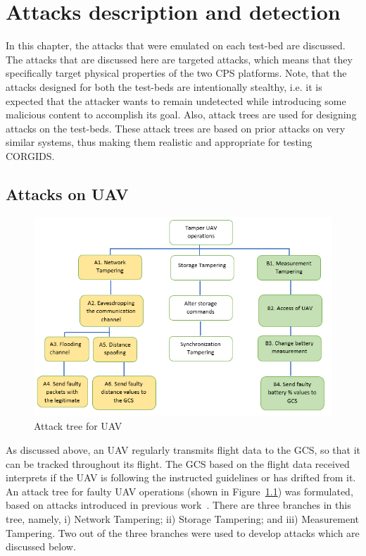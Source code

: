 
\chapter{\textbf{Attacks description and detection}}
\label{ch:Attacks}

In this chapter, the attacks that were emulated on each test-bed are discussed. The attacks that are discussed here are  targeted attacks, which means that they specifically target physical properties of the two CPS platforms. Note, that the attacks designed for both the test-beds are intentionally stealthy, i.e. it is expected that the attacker wants to remain undetected while introducing some malicious content to accomplish its goal. Also, attack trees are used for designing attacks on the test-beds. These attack trees are based on prior attacks on very similar systems, thus making them realistic and appropriate for testing CORGIDS.


\section{Attacks on UAV}

\begin{figure}[ht]
    \centering
    \includegraphics[scale=0.55,keepaspectratio = true]{Graphics/AttackTreeUAVNew.png}
    \caption{Attack tree for UAV}
    \label{fig:attackTreeUAV}
\end{figure}
As discussed above, an UAV regularly transmits flight data to the GCS, so that it can be tracked throughout its flight. The GCS based on the flight data received interprets if the UAV is following the instructed guidelines or has drifted from it. An attack tree for faulty UAV operations (shown in Figure~\ref{fig:attackTreeUAV}) was formulated, based on attacks introduced in previous work~\cite{javaid2012cyber, mitchell2012specification}. There are three branches in this tree, namely, i) Network Tampering; ii) Storage Tampering; and iii) Measurement Tampering. Two out of the three branches were used to develop attacks which are discussed below.

